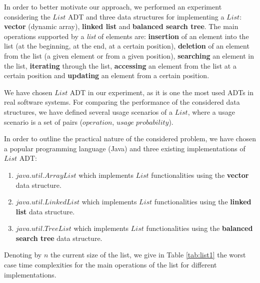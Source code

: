 In order to better motivate our approach, we performed an experiment considering the $List$ ADT and three data structures for implementing a $List$: \textbf{vector} (dynamic array), \textbf{linked list} and \textbf{balanced search tree}. The main operations supported by a \emph{list} of elements are: \textbf{insertion} of an element into the list (at the beginning, at the end, at a certain position), \textbf{deletion} of an element from the list (a given element or from a given position), \textbf{searching} an element in the list, \textbf{iterating} through the list, \textbf{accessing} an element from the list at a certain position and \textbf{updating} an element from a certain position.

We have chosen $List$ ADT in our experiment, as it is one the most used ADTs in real software systems.
For comparing the performance of the considered data structures, we have defined several usage scenarios of a $List$, where a usage scenario is a set of pairs ($operation$, $usage\;probability$).

In order to outline the practical nature of the considered problem, we have chosen a popular programming language (Java) and three existing implementations of $List$ ADT:

\begin{enumerate}

\item $java.util.ArrayList$ which implements $List$ functionalities using the \textbf{vector} data structure.

\item $java.util.LinkedList$ which implements $List$ functionalities using the \textbf{linked list} data structure.

\item $java.util.TreeList$ which implements $List$ functionalities using the \textbf{balanced search tree} data structure.

\end{enumerate}

Denoting by $n$ the current size of the list, we give in Table \ref{tab:list1} the worst case time complexities for the main operations of the list for different implementations.

